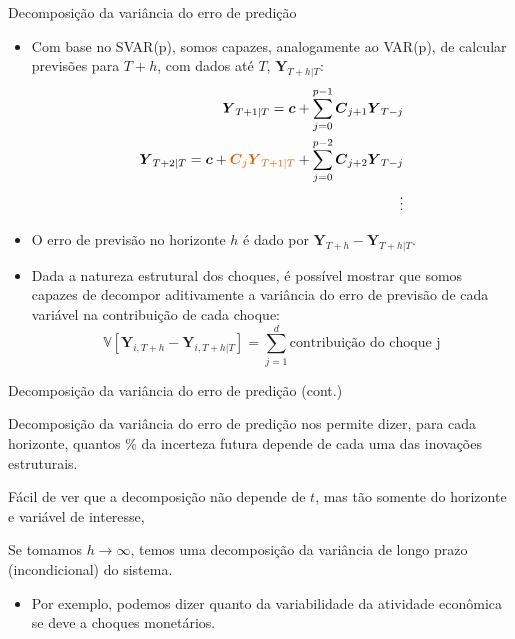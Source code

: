 \documentclass[11pt]{beamer}
\newenvironment{halfwideitemize}{\itemize\addtolength{\itemsep}{0.5em}}{\enditemize}
\begin{document}
\begin{frame}{Decomposição da variância do erro de predição}
		\begin{itemize}
		\item Com base no SVAR(p), somos capazes, analogamente ao VAR(p), de calcular previsões para $T+h$, com dados até $T$, $\boldsymbol{Y}_{T+h|T}$:
		\begin{align*}
			\boldsymbol{Y}_{T+1|T} = \boldsymbol{c} + \sum_{j=0}^{p-1} \boldsymbol{C}_{j+1} \boldsymbol{Y}_{T-j} \\
				\boldsymbol{Y}_{T+2|T} = \boldsymbol{c} +  {\color{red}\boldsymbol{C}_{j}\boldsymbol{Y}_{T+1|T}} +  \sum_{j=0}^{p-2} \boldsymbol{C}_{j+2} \boldsymbol{Y}_{T-j}  \\
				\vdots
		\end{align*}
	\end{itemize}
	\begin{itemize}
\item O erro de previsão no horizonte $h$ é dado por $\boldsymbol{Y}_{T+h} - \boldsymbol{Y}_{T+h|T}$.
\item Dada a natureza estrutural dos choques, é possível mostrar que somos capazes de decompor aditivamente a {\color{blue}variância do erro de previsão de cada variável} na contribuição de cada choque:
$$\mathbb{V}[\boldsymbol{Y}_{i,T+h} - \boldsymbol{Y}_{i, T+h|T}] = \sum_{j=1}^d \text{contribuição do choque j}$$
	\end{itemize}
\end{frame}

\begin{frame}{Decomposição da variância do erro de predição (cont.)}
	\begin{halfwideitemize}

		\item Decomposição da variância do erro de predição nos permite dizer, para cada horizonte, quantos \% da incerteza futura depende de cada uma das inovações estruturais.
				\item Fácil de ver que a decomposição não depende de $t$, mas tão somente do horizonte e variável de interesse,
		\item Se tomamos $h \to \infty$, temos uma decomposição da variância de longo prazo (incondicional) do sistema.
		\begin{itemize}
			\item Por exemplo, podemos dizer quanto da variabilidade da atividade econômica se deve a choques monetários.
		\end{itemize}
	\end{halfwideitemize}
\end{frame}
\end{document}
